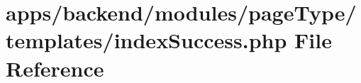 \hypertarget{backend_2modules_2page_type_2templates_2index_success_8php}{\section{apps/backend/modules/page\-Type/templates/index\-Success.php File Reference}
\label{backend_2modules_2page_type_2templates_2index_success_8php}
}
